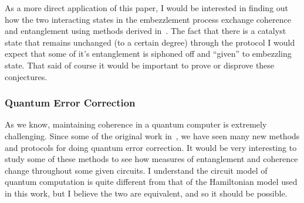 \documentclass[11pt]{article}
\theoremstyle{definition}
\begin{document}
As a more direct application of this paper, I would be interested in finding out how the two interacting states in the embezzlement process exchange coherence and entanglement using methods derived in~\cite{dynamic-entropies}. The fact that there is a catalyst state that remains unchanged (to a certain degree) through the protocol I would expect that some of it's entanglement is siphoned off and ``given'' to embezzling state. That said of course it would be important to prove or disprove these conjectures.

\subsubsection{Quantum Error Correction}
As we know, maintaining coherence in a quantum computer is extremely challenging. Since some of the original work in~\cite{error-correction}, we have seen many new methods and protocols for doing quantum error correction. It would be very interesting to study some of these methods to see how measures of entanglement and coherence change throughout some given circuits. I understand the circuit model of quantum computation is quite different from that of the Hamiltonian model used in this work, but I believe the two are equivalent, and so it should be possible.

\clearpage


\end{document}
